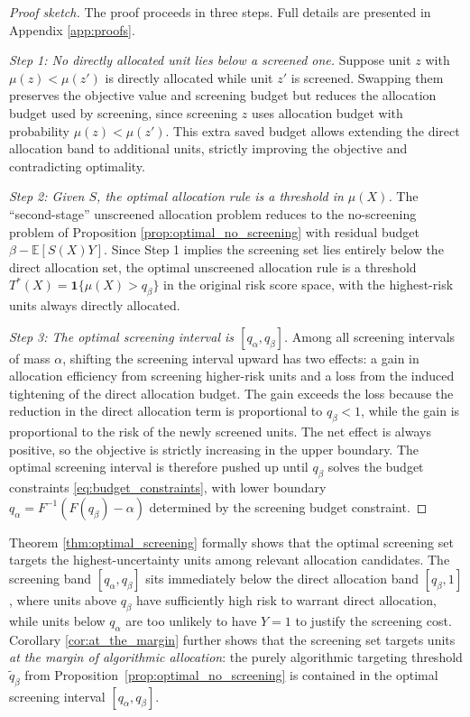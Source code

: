 \begin{proof}[Proof sketch]
The proof proceeds in three steps. Full details are presented in Appendix \ref{app:proofs}.

\textit{Step 1: No directly allocated unit lies below a screened one.} Suppose unit $z$ with $\mu(z) < \mu(z')$ is directly allocated while unit $z'$ is screened. Swapping them preserves the objective value and screening budget but reduces the allocation budget used by screening, since screening $z$ uses allocation budget with probability $\mu(z) < \mu(z')$. This extra saved budget allows extending the direct allocation band to additional units, strictly improving the objective and contradicting optimality.


\textit{Step 2: Given $S$, the optimal allocation rule is a threshold in $\mu(X)$.} The ``second-stage'' unscreened allocation problem reduces to the no-screening problem of Proposition \ref{prop:optimal_no_screening} with residual budget $\beta - \mathbb{E}[S(X)Y]$. Since Step 1 implies the screening set lies entirely below the direct allocation set, the optimal unscreened allocation rule is a threshold $T^*(X) = \mathbf{1}\{\mu(X) > q_\beta\}$ in the original risk score space, with the highest-risk units always directly allocated.

\textit{Step 3: The optimal screening interval is $[q_\alpha, q_\beta]$.} Among all screening intervals of mass $\alpha$, shifting the screening interval upward has two effects: a gain in allocation efficiency from screening higher-risk units and a loss from the induced tightening of the direct allocation budget. The gain exceeds the loss because the reduction in the direct allocation term is proportional to $q_\beta < 1$, while the gain is proportional to the risk of the newly screened units. The net effect is always positive, so the objective is strictly increasing in the upper boundary. The optimal screening interval is therefore pushed up until $q_\beta$ solves the budget constraints \eqref{eq:budget_constraints}, with lower boundary $q_\alpha = F^{-1}(F(q_\beta) - \alpha)$ determined by the screening budget constraint.
\end{proof}



Theorem \ref{thm:optimal_screening} formally shows that the optimal screening set targets the highest-uncertainty units among relevant allocation candidates. The screening band $[q_\alpha, q_\beta]$ sits immediately below the direct allocation band $[q_\beta, 1]$, where units above $q_\beta$ have sufficiently high risk to warrant direct allocation, while units below $q_\alpha$ are too unlikely to have $Y=1$ to justify the screening cost. Corollary \ref{cor:at_the_margin} further shows that the screening set targets units \textit{at the margin of algorithmic allocation}: the purely algorithmic targeting threshold $\widetilde{q}_\beta$ from Proposition~\ref{prop:optimal_no_screening} is contained in the optimal screening interval $[q_\alpha, q_\beta]$.

